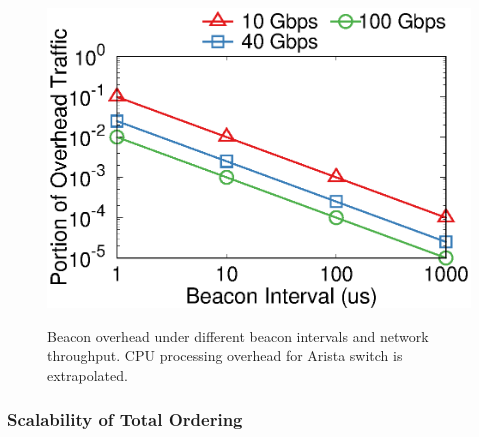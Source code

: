 \begin{figure}[t]
\begin{minipage}[t]{.32\textwidth}
		{\includegraphics[width=\textwidth]{gnuplot/beacon_network_overhead.eps}}
		\newline
		\caption{
			Beacon overhead under different beacon intervals and network throughput.
			CPU processing overhead for Arista switch is extrapolated.
		}
		\label{fig:overhead}
	\end{minipage}
\vspace{-1.6em}
\end{figure}

\subsubsection{Scalability of Total Ordering}

